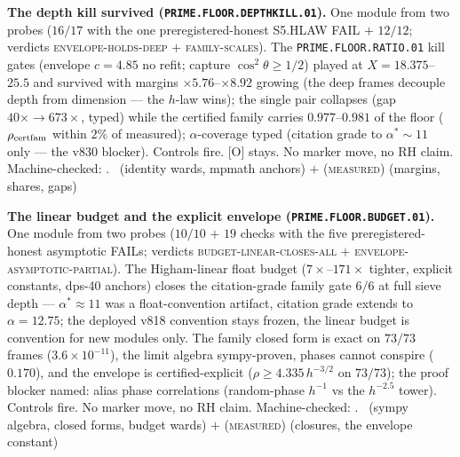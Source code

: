 \par\smallskip\noindent\textbf{The depth kill survived
(\texttt{PRIME.FLOOR.DEPTHKILL.01}).}
One module from two probes ($16/17$ with the one
preregistered-honest S5.HLAW FAIL $+$ $12/12$; verdicts
\textsc{envelope-holds-deep} $+$ \textsc{family-scales}).  The
\texttt{PRIME.FLOOR.RATIO.01} kill gates (envelope $c = 4.85$ no
refit; capture $\cos^2\theta \ge 1/2$) played at
$X = 18.375$--$25.5$ and survived with margins
$\times5.76$--$\times8.92$ growing (the deep frames decouple
depth from dimension --- the $h$-law wins); the single pair
collapses (gap $40\times \to 673\times$, typed) while the
certified family carries $0.977$--$0.981$ of the floor
($\rho_{\rm certfam}$ within $2\%$ of measured);
$\alpha$-coverage typed (citation grade to $\alpha^* \sim 11$
only --- the v830 blocker).  Controls fire.  [O] stays.  No
marker move, no RH claim.
Machine-checked: .
\mE\ (identity wards, mpmath anchors) $+$ (\textsc{measured})
(margins, shares, gaps)
\par\smallskip


\par\smallskip\noindent\textbf{The linear budget and the explicit
envelope (\texttt{PRIME.FLOOR.BUDGET.01}).}
One module from two probes ($10/10$ $+$ $19$ checks with the five
preregistered-honest asymptotic FAILs; verdicts
\textsc{budget-linear-closes-all} $+$
\textsc{envelope-asymptotic-partial}).  The Higham-linear float
budget ($7\times$--$171\times$ tighter, explicit constants,
dps-40 anchors) closes the citation-grade family gate $6/6$ at
full sieve depth --- $\alpha^* \approx 11$ was a float-convention
artifact, citation grade extends to $\alpha = 12.75$; the
deployed v818 convention stays frozen, the linear budget is
convention for new modules only.  The family closed form is
exact on $73/73$ frames ($3.6\times10^{-11}$), the limit algebra
sympy-proven, phases cannot conspire ($0.170$), and the envelope
is certified-explicit ($\rho \ge 4.335\,h^{-3/2}$ on $73/73$);
the proof blocker named: alias phase correlations (random-phase
$h^{-1}$ vs the $h^{-2.5}$ tower).  Controls fire.  No marker
move, no RH claim.
Machine-checked: .
\mE\ (sympy algebra, closed forms, budget wards) $+$
(\textsc{measured}) (closures, the envelope constant)
\par\smallskip


